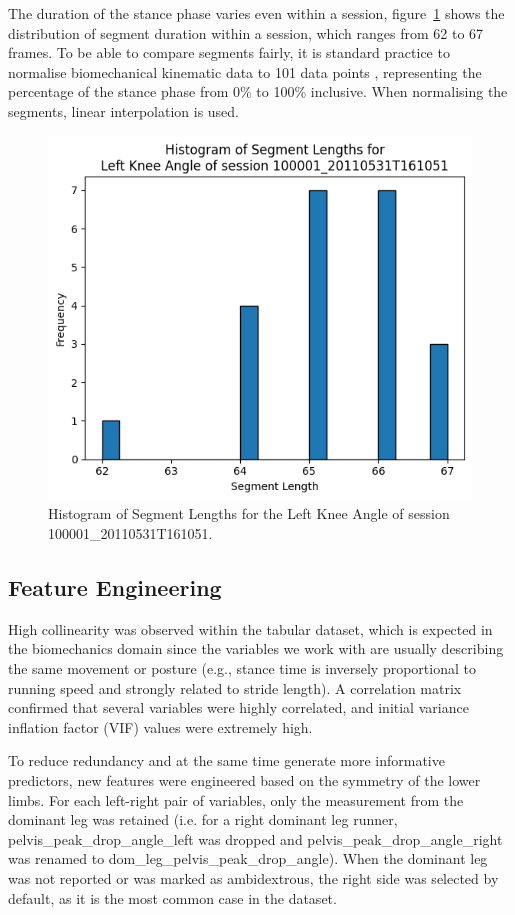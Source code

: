 The duration of the stance phase varies even within a session, figure~\ref{fig:met-hist-segments} shows the distribution of segment duration within a session, which ranges from 62 to 67 frames. To be able to compare segments fairly, it is standard practice to normalise biomechanical kinematic data to 101 data points \citep{Crane2010,FuentesJimnez2025}, representing the percentage of the stance phase from 0\% to 100\% inclusive. When normalising the segments, linear interpolation is used.

\begin{figure}[ht]
    \centering
    \includegraphics[width=0.5\columnwidth]{images/hist_segment_lengths_L_knee_angle.png}
    \caption[Histogram of Segment Lengths for a session]{Histogram of Segment Lengths for the Left Knee Angle of session 100001\_20110531T161051.\label{fig:met-hist-segments}}
\end{figure}

\subsection{Feature Engineering}\label{subsec:method-feature-engineering}
High collinearity was observed within the tabular dataset, which is expected in the biomechanics domain since the variables we work with are usually describing the same movement or posture (e.g., stance time is inversely proportional to running speed and strongly related to stride length). A correlation matrix confirmed that several variables were highly correlated, and initial variance inflation factor (VIF) values were extremely high.

To reduce redundancy and at the same time generate more informative predictors, new features were engineered based on the symmetry of the lower limbs. For each left-right pair of variables, only the measurement from the dominant leg was retained (i.e. for a right dominant leg runner, pelvis\_peak\_drop\_angle\_left was dropped and pelvis\_peak\_drop\_angle\_right was renamed to dom\_leg\_pelvis\_peak\_drop\_angle). When the dominant leg was not reported or was marked as ambidextrous, the right side was selected by default, as it is the most common case in the dataset.

